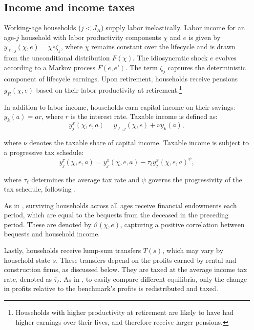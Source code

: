\documentclass[parskip=full]{article}
\begin{document}
\subsection{Income and income taxes}\label{subsection:income}

Working-age households ($j<J_{R}$) supply labor inelastically. Labor income for an age-$j$ household with labor productivity components $\chi$ and $e$ is given by $y_{\ell,j}(\chi,e)=\chi e\zeta_j$, where $\chi$ remains constant over the lifecycle and is drawn from the unconditional distribution $\hat{F}(\chi)$. The idiosyncratic shock $e$ evolves according to a Markov process $F(e,e')$. The term $\zeta_j$ captures the deterministic component of lifecycle earnings. Upon retirement, households receive pensions $y_{R}(\chi,e)$ based on their labor productivity at retirement.\footnote{Households with higher productivity at retirement are likely to have had higher earnings over their lives, and therefore receive larger pensions.}

In addition to labor income, households earn capital income on their savings: $y_{k}(a)=ar$, where $r$ is the interest rate. Taxable income is defined as:
\begin{equation*}\label{eq:taxable_labor_income}
  y^{x}_{j}(\chi,e,a) =y_{\ell,j}(\chi,e)+\nu y_{k}(a),
\end{equation*}

\noindent where $\nu$ denotes the taxable share of capital income. Taxable income is subject to a progressive tax schedule:
\begin{equation}\label{eq:income_tax}
  y^{\tau}_{j}(\chi,e,a) = y^{x}_{j}(\chi,e,a)-\tau_{\ell}y^{x}_{j}(\chi,e,a)^{\psi},
\end{equation}

\noindent where $\tau_{\ell}$ determines the average tax rate and $\psi$ governs the progressivity of the tax schedule, following \citep{hsv-2020}.

As in \citet{kkk-2021}, surviving households across all ages receive financial endowments each period, which are equal to the bequests from the deceased in the preceding period. These are denoted by $\vartheta (\chi,e)$, capturing a positive correlation between bequests and household income.

Lastly, households receive lump-sum transfers $T(s)$, which may vary by household state $s$. These transfers depend on the profits earned by rental and construction firms, as discussed below. They are taxed at the average income tax rate, denoted as $\overline{\tau}_{\ell}$. As in \citet{kkk-2021}, to easily compare different equilibria, only the change in profits relative to the benchmark's profits is redistributed and taxed.
\end{document}
